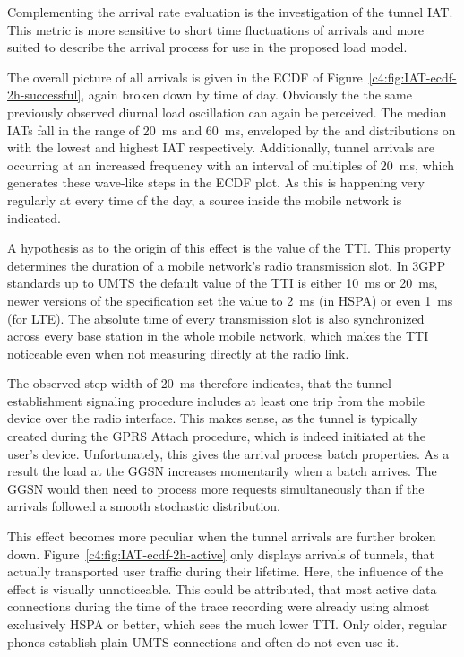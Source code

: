 Complementing the arrival rate evaluation is the investigation of the tunnel \gls{IAT}. This metric is more sensitive to short time fluctuations of arrivals and more suited to describe the arrival process for use in the proposed load model.

The overall picture of all arrivals is given in the \gls{ECDF} of Figure~\ref{c4:fig:IAT-ecdf-2h-successful}, again broken down by time of day. Obviously the the same previously observed diurnal load oscillation can again be perceived. The median \glspl{IAT} fall in the range of \SI{20}{\milli\second} and \SI{60}{\milli\second}, enveloped by the  and distributions on with the lowest and highest \gls{IAT} respectively. Additionally, tunnel arrivals are occurring at an increased frequency with an interval of multiples of \SI{20}{\milli\second}, which generates these wave-like steps in the \gls{ECDF} plot. As this is happening very regularly at every time of the day, a source inside the mobile network is indicated.

A hypothesis as to the origin of this effect is the value of the \gls{TTI}. This property determines the duration of a mobile network's radio transmission slot. In \gls{3GPP} standards up to \gls{UMTS} the default value of the \gls{TTI} is either \SI{10}{\milli\second} or \SI{20}{\milli\second}, newer versions of the specification set the value to \SI{2}{\milli\second} (in \gls{HSPA}) or even \SI{1}{\milli\second} (for \gls{LTE}). The absolute time of every transmission slot is also synchronized across every base station in the whole mobile network, which makes the \gls{TTI} noticeable even when not measuring directly at the radio link. 

The observed step-width of \SI{20}{\milli\second} therefore indicates, that the tunnel establishment signaling procedure includes at least one trip from the mobile device over the radio interface. This makes sense, as the tunnel is typically created during the \gls{GPRS} Attach procedure, which is indeed initiated at the user's device. Unfortunately, this gives the arrival process batch properties. As a result the load at the \gls{GGSN} increases momentarily when a batch arrives. The \gls{GGSN} would then need to process more requests simultaneously than if the arrivals followed a smooth stochastic distribution.

This effect becomes more peculiar when the tunnel arrivals are further broken down. Figure~\ref{c4:fig:IAT-ecdf-2h-active} only displays arrivals of tunnels, that actually transported user traffic during their lifetime. Here, the influence of the effect is visually unnoticeable. This could be attributed, that most active data connections during the time of the trace recording were already using almost exclusively \gls{HSPA} or better, which sees the much lower \gls{TTI}. Only older, regular phones establish plain \gls{UMTS} connections and often do not even use it.

